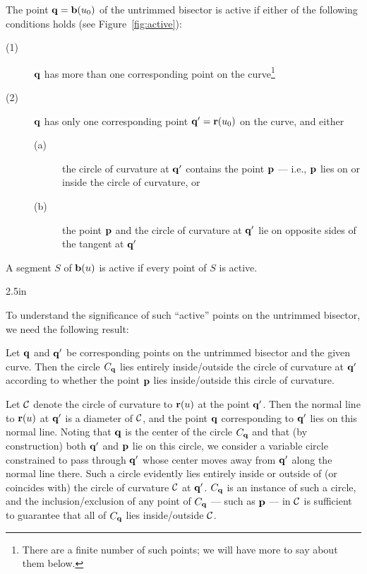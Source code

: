 
\begin{dfn} \label{dfn:active}
The point ${\bf q} = {\bf b}(u_{0})$ of the untrimmed bisector
is {\rm active} if either of the following conditions holds (see
Figure~\ref{fig:active}):
\begin{description}
\item[{\rm (1)}]
        ${\bf q}$ has more than one corresponding point on the
        curve\footnote{There are a finite number of such points;
        we will have more to say about them below.}
\item[{\rm (2)}]
        ${\bf q}$ has only one corresponding point ${\bf q}' =
        {\bf r}(u_0)$ on the curve, and either
\begin{description}
\item[{\rm (a)}]
        the circle of curvature at ${\bf q}'$ contains the point ${\bf p}$
        --- i.e., ${\bf p}$ lies on or inside the circle of curvature, or
\item[{\rm (b)}]
        the point ${\bf p}$ and the circle of curvature at ${\bf q}'$
        lie on opposite sides of the tangent at ${\bf q'}$
\end{description}
\end{description}
A segment $S$ of ${\bf b}(u)$ is active if every point of $S$ is active.
\end{dfn}

{2.5in}

To understand the significance of such ``active'' points on the untrimmed
bisector, we need the following result:

\begin{lma} \label{lma:circles}
Let ${\bf q}$ and ${\bf q}'$ be corresponding points on the untrimmed
bisector and the given curve. Then the circle $C_{\bf q}$ lies entirely
inside/outside the circle of curvature at ${\bf q}'$ according to whether
the point ${\bf p}$ lies inside/outside this circle of curvature.
\end{lma}
\prf
Let ${\cal C}$ denote the circle of curvature to ${\bf r}(u)$ at the
point ${\bf q}'$. Then the normal line to ${\bf r}(u)$ at ${\bf q}'$
is a diameter of ${\cal C}$, and the point ${\bf q}$ corresponding
to ${\bf q}'$ lies on this normal line. Noting that ${\bf q}$ is
the center of the circle $C_{\bf q}$ and that (by construction) both
${\bf q}'$ and ${\bf p}$ lie on this circle, we consider a variable
circle constrained to pass through ${\bf q}'$ whose center moves away
from ${\bf q}'$ along the normal line there. Such a circle evidently
lies entirely inside or outside of (or coincides with) the circle of
curvature ${\cal C}$ at ${\bf q}'$. $C_{\bf q}$ is an instance of
such a circle, and the inclusion/exclusion of any point of $C_{\bf q}$
--- such as ${\bf p}$ --- in ${\cal C}$ is sufficient to guarantee
that all of $C_{\bf q}$ lies inside/outside ${\cal C}$.
\QED

